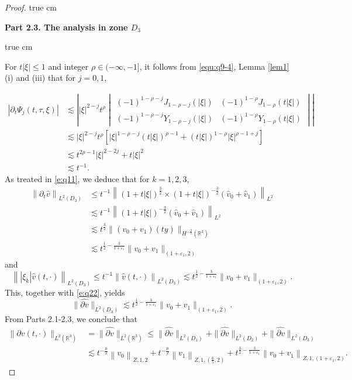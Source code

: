 \documentclass[10pt,a4paper]{amsart}
\newcommand{\R}{\mathbb R}
\newcommand{\f}{\frac}
\newcommand{\p}{\partial}
\begin{document}
\begin{proof}
 true cm

{\bf Part 2.3.  The analysis  in zone $D_3$}

 true cm

For $t|\xi|\le 1$ and integer $\rho\in(-\infty,-1]$, it follows from \eqref{equ:q9-4}, Lemma \ref{lem1} (i) and (iii) that for $j=0,1$,

\begin{equation}\label{e:q21}
\begin{aligned}
|\p_t\Psi_j(t,\tau,\xi)|
&\lesssim \left| |\xi|^{2-j} t^{\rho}
\begin{vmatrix}
(-1)^{1-\rho-j}J_{1-\rho-j}(|\xi|) & (-1)^{1-\rho}J_{1-\rho}(t|\xi|) \\
(-1)^{1-\rho-j}Y_{1-\rho-j}(|\xi|) & (-1)^{1-\rho}Y_{1-\rho}(t|\xi|)
\end{vmatrix} \right|\\
&\lesssim |\xi|^{2-j} t^{\rho}\left[|\xi|^{1-\rho-j}(t|\xi|)^{\rho-1}+(t|\xi|)^{1-\rho}|\xi|^{\rho-1+j}\right]\\
&\lesssim t^{2\rho-1}|\xi|^{2-2j}+t|\xi|^2\\
&\lesssim t^{-1}.
\end{aligned}
\end{equation}
As treated in \eqref{e:q11}, we deduce that for $k=1, 2, 3$,
\begin{equation}\label{e:q22}
\begin{aligned}
\left\|\p_t\hat{v}\right\|_{L^2(D_3)} & \leq t^{-1}\left\|(1+t|\xi|)^{\f32}\times(1+t|\xi|)^{-\f32}(\hat{v}_{0}+\hat{v}_{1})\right\|_{L^{2}} \\
&\lesssim t^{-1}\left\|(1+t|\xi|)^{-\f32}(\hat{v}_{0}+\hat{v}_{1})\right\|_{L^{2}}\\
& \lesssim t^{\f32} \|(v_0+v_1)(ty)\|_{H^{-\f32}(\R^3)}\\
&\lesssim t^{\f12-\f{3}{1+\varepsilon_1}}\|v_0+v_1\|_{(1+\varepsilon_1, 2)}
\end{aligned}
\end{equation}
and
$$
\left\||\xi_k|\hat{v}(t, \cdot)\right\|_{L^2(D_3)}\leq t^{-1}\left\|\hat{v}(t, \cdot)\right\|_{L^2(D_3)} \lesssim t^{\f12-\f{3}{1+\varepsilon_1}}\|v_0+v_1\|_{(1+\varepsilon_1, 2)}.
$$
This, together with \eqref{e:q22}, yields
\begin{equation}\label{e:q23}
\|\widehat{\p v}\|_{L^2(D_3)}\lesssim t^{\f12-\f{3}{1+\varepsilon_1}}\|v_0+v_1\|_{(1+\varepsilon_1, 2)}.
\end{equation}
From Parts 2.1-2.3, we conclude that
\begin{equation}\label{e:q24}
\begin{aligned}
\|\p v(t, \cdot)\|_{L^2(\R^3)}&=\|\widehat{\p v}\|_{L^2(\R^3)} \leq\|\widehat{\p v}\|_{L^2(D_1)}
+\|\widehat{\p v}\|_{L^2(D_2)}+\|\widehat{\p v}\|_{L^2(D_3)}\\
& \lesssim t^{-\f{\mu}{2}}\left\|v_0\right\|_{Z, 1, 2}+t^{-\f{\mu}{2}}\left\|v_1\right\|_{Z, 1,(\f65, 2)}+t^{\f32-\f{3}{1+\varepsilon_1}}\left\|v_0+v_1\right\|_{Z, 1,(1+\varepsilon_1, 2)}.
\end{aligned}
\end{equation}




\end{proof}
\end{document}
